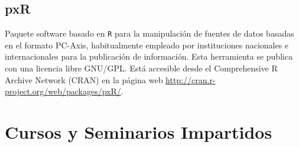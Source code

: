 \documentclass[article, a4paper]{memoir}
\begin{document}
\subsection{pxR}
\label{sec:orgheadline77}
Paquete software basado en \texttt{R} para la manipulación de fuentes de datos basadas en el formato PC-Axis, habitualmente empleado por instituciones nacionales e internacionales para la publicación de información.  Esta herramienta se publica con una licencia libre GNU/GPL. Está accesible desde el Comprehensive R Archive Network (CRAN) en la página web \url{http://cran.r-project.org/web/packages/pxR/}.

\section{Cursos y Seminarios Impartidos}
\label{sec:orgheadline79}
\end{document}
